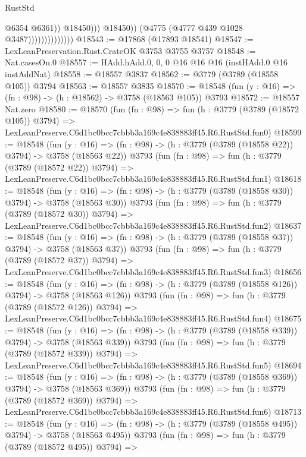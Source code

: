 \begin{lexlean}{RustStd}
\begin{coremodule}
                                          @6354
                                          @6361))
                                      @18450)))
                                @18450))
                            (@4775 (@4777 @439 @1028 @3487))))))))))))))
@18543 := @17868 (@17893 @18541)
@18547 := LexLeanPreservation.Rust.CrateOK @3753 @3755 @3757
@18548 := Nat.casesOn.{0}
@18557 := HAdd.hAdd.{0, 0, 0} @16 @16 @16 (instHAdd.{0} @16 instAddNat)
@18558 := @18557 @3837
@18562 := @3779 (@3789 (@18558 @105)) @3794
@18563 := @18557 @3835
@18570 := @18548 (fun (y : @16) => (fn : @98) -> (h : @18562) -> @3758 (@18563 @105)) @3793
@18572 := @18557 Nat.zero
@18580 := @18570
    (fun (fn : @98) =>
    fun (h : @3779 (@3789 (@18572 @105)) @3794) =>
    LexLeanPreserve.C6d1bc0bcc7cbbb3a169c4e838883ff45.R6.RustStd.fun0)
@18599 := @18548
    (fun (y : @16) => (fn : @98) -> (h : @3779 (@3789 (@18558 @22)) @3794) -> @3758 (@18563 @22))
    @3793
    (fun (fn : @98) =>
    fun (h : @3779 (@3789 (@18572 @22)) @3794) =>
    LexLeanPreserve.C6d1bc0bcc7cbbb3a169c4e838883ff45.R6.RustStd.fun1)
@18618 := @18548
    (fun (y : @16) => (fn : @98) -> (h : @3779 (@3789 (@18558 @30)) @3794) -> @3758 (@18563 @30))
    @3793
    (fun (fn : @98) =>
    fun (h : @3779 (@3789 (@18572 @30)) @3794) =>
    LexLeanPreserve.C6d1bc0bcc7cbbb3a169c4e838883ff45.R6.RustStd.fun2)
@18637 := @18548
    (fun (y : @16) => (fn : @98) -> (h : @3779 (@3789 (@18558 @37)) @3794) -> @3758 (@18563 @37))
    @3793
    (fun (fn : @98) =>
    fun (h : @3779 (@3789 (@18572 @37)) @3794) =>
    LexLeanPreserve.C6d1bc0bcc7cbbb3a169c4e838883ff45.R6.RustStd.fun3)
@18656 := @18548
    (fun (y : @16) => (fn : @98) -> (h : @3779 (@3789 (@18558 @126)) @3794) -> @3758 (@18563 @126))
    @3793
    (fun (fn : @98) =>
    fun (h : @3779 (@3789 (@18572 @126)) @3794) =>
    LexLeanPreserve.C6d1bc0bcc7cbbb3a169c4e838883ff45.R6.RustStd.fun4)
@18675 := @18548
    (fun (y : @16) => (fn : @98) -> (h : @3779 (@3789 (@18558 @339)) @3794) -> @3758 (@18563 @339))
    @3793
    (fun (fn : @98) =>
    fun (h : @3779 (@3789 (@18572 @339)) @3794) =>
    LexLeanPreserve.C6d1bc0bcc7cbbb3a169c4e838883ff45.R6.RustStd.fun5)
@18694 := @18548
    (fun (y : @16) => (fn : @98) -> (h : @3779 (@3789 (@18558 @369)) @3794) -> @3758 (@18563 @369))
    @3793
    (fun (fn : @98) =>
    fun (h : @3779 (@3789 (@18572 @369)) @3794) =>
    LexLeanPreserve.C6d1bc0bcc7cbbb3a169c4e838883ff45.R6.RustStd.fun6)
@18713 := @18548
    (fun (y : @16) => (fn : @98) -> (h : @3779 (@3789 (@18558 @495)) @3794) -> @3758 (@18563 @495))
    @3793
    (fun (fn : @98) =>
    fun (h : @3779 (@3789 (@18572 @495)) @3794) =>

\end{coremodule}
\end{lexlean}
